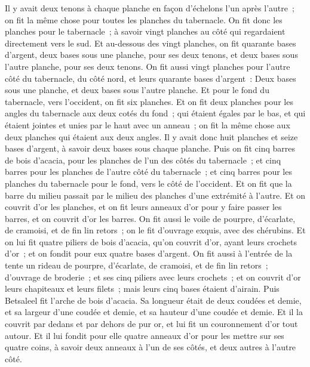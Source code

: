 \begin{multicols}{2}
Il y avait deux tenons à chaque planche en façon d'échelons l'un après l'autre~; on fit la même chose pour toutes les planches du tabernacle.
On fit donc les planches pour le tabernacle~; à savoir vingt planches au côté qui regardaient directement vers le sud.
Et au-dessous des vingt planches, on fit quarante bases d'argent, deux bases sous une planche, pour ses deux tenons, et deux bases sous l'autre planche, pour ses deux tenons.
On fit aussi vingt planches pour l'autre côté du tabernacle, du côté nord,
et leurs quarante bases d'argent~: Deux bases sous une planche, et deux bases sous l'autre planche.
Et pour le fond du tabernacle, vers l'occident, on fit six planches.
Et on fit deux planches pour les angles du tabernacle aux deux cotés du fond~;
qui étaient égales par le bas, et qui étaient jointes et unies par le haut avec un anneau~; on fit la même chose aux deux planches qui étaient aux deux angles.
Il y avait donc huit planches et seize bases d'argent, à savoir deux bases sous chaque planche.
Puis on fit cinq barres de bois d'acacia, pour les planches de l'un des côtés du tabernacle~;
et cinq barres pour les planches de l'autre côté du tabernacle~; et cinq barres pour les planches du tabernacle pour le fond, vers le côté de l'occident.
Et on fit que la barre du milieu passait par le milieu des planches d'une extrémité à l'autre.
Et on couvrit d'or les planches, et on fit leurs anneaux d'or pour y faire passer les barres, et on couvrit d'or les barres.
On fit aussi le voile de pourpre, d'écarlate, de cramoisi, et de fin lin retors~; on le fit d'ouvrage exquis, avec des chérubins.
Et on lui fit quatre piliers de bois d'acacia, qu'on couvrit d'or, ayant leurs crochets d'or~; et on fondit pour eux quatre bases d'argent.
On fit aussi à l'entrée de la tente un rideau de pourpre, d'écarlate, de cramoisi, et de fin lin retors~; d'ouvrage de broderie~;
et ses cinq piliers avec leurs crochets~; et on couvrit d'or leurs chapiteaux et leurs filets~; mais leurs cinq bases étaient d'airain.
\VerseOne{}Puis Betsaleel fit l'arche de bois d'acacia. Sa longueur était de deux coudées et demie, et sa largeur d'une coudée et demie, et sa hauteur d'une coudée et demie.
Et il la couvrit par dedans et par dehors de pur or, et lui fit un couronnement d'or tout autour.
Et il lui fondit pour elle quatre anneaux d'or pour les mettre sur ses quatre coins, à savoir deux anneaux à l'un de ses côtés, et deux autres à l'autre côté.

\end{multicols}
